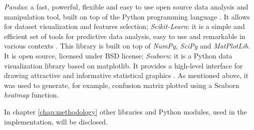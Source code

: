 \begin{itemize}
    \itemAR \textit{Pandas}: a fast, powerful, flexible and easy to use open source data analysis and manipulation tool, built on top of the Python programming language \cite{PandasLibrary}. It allows for dataset visualization and features selection;
    \itemAR \textit{Scikit-Learn}: it is a simple and efficient set of tools for predictive data analysis, easy to use and remarkable in various contexts \cite{ScikitWebsite}. This library is built on top of \textit{NumPy}, \textit{SciPy} and \textit{MatPlotLib}. It is open source, licensed under BSD license;
    \itemAR \textit{Seaborn}: it is a Python data visualization library based on matplotlib. It provides a high-level interface for drawing attractive and informative statistical graphics \cite{SeabornLibrary}. As mentioned above, it was used to generate, for example, confusion matrix plotted using a Seaborn \textit{heatmap} function.
\end{itemize}

\noindent In chapter \ref{chap:methodology} other libraries and Python modules, used in the implementation, will be disclosed.